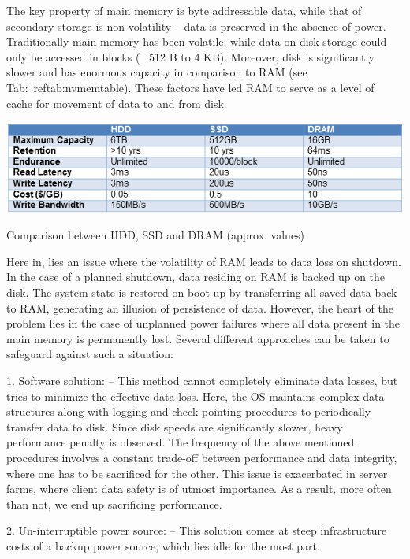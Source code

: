 The key property of main memory is byte addressable data, while that of secondary storage is non-volatility -- data is preserved in the absence of power. Traditionally main memory has been volatile, while data on disk storage could only be accessed in blocks (~ 512 B to 4 KB). Moreover, disk is significantly slower and has enormous capacity in comparison to RAM (see Tab:~ref{tab:nvmemtable}). These factors have led RAM to serve as a level of cache for movement of data to and from disk. 

\setlength{\belowcaptionskip}{-10pt}

\begin{table}[H]
  \centering
  \includegraphics[scale=0.6]{figures/nvmemorytable.png}
  \caption{Comparison between HDD, SSD and DRAM (approx. values)}
  \label{tab:nvmemtable}
\end{table}

Here in, lies an issue where the volatility of RAM leads to data loss on shutdown. In the case of a planned shutdown, data residing on RAM is backed up on the disk. The system state is restored on boot up by transferring all saved data back to RAM, generating an illusion of persistence of data. However, the heart of the problem lies in the case of unplanned power failures where all data present in the main memory is permanently lost. Several different approaches can be taken to safeguard against such a situation: 

1. Software solution: -- This method cannot completely eliminate data losses, but tries to minimize the effective data loss. Here, the OS maintains complex data structures along with logging and check-pointing procedures to periodically transfer data to disk. Since disk speeds are significantly slower, heavy performance penalty is observed. The frequency of the above mentioned procedures involves a constant trade-off between performance and data integrity, where one has to be sacrificed for the other. This issue is exacerbated in server farms, where client data safety is of utmost importance. As a result, more often than not, we end up sacrificing performance. 

2. Un-interruptible power source: -- This solution comes at steep infrastructure costs of a backup power source, which lies idle for the most part.


